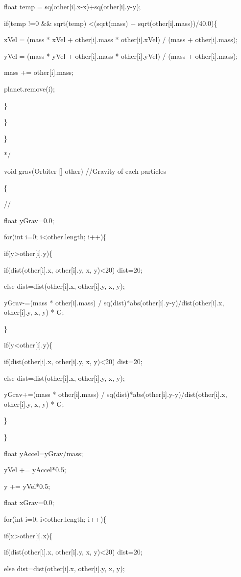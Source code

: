 \documentclass{gshs-hutech}
\begin{document}
\begin{tiny}
float temp = sq(other[i].x-x)+sq(other[i].y-y);

if(temp !=0 \&\& sqrt(temp) \textless (sqrt(mass) + sqrt(other[i].mass))/40.0)\{

xVel = (mass * xVel + other[i].mass * other[i].xVel) / (mass + other[i].mass);

yVel = (mass * yVel + other[i].mass * other[i].yVel) / (mass + other[i].mass);

mass += other[i].mass;

planet.remove(i);

\}

\}

\}

*/

void grav(Orbiter [] other)                                                                                          //Gravity of each particles

\{

//

float yGrav=0.0;

for(int i=0; i\textless other.length; i++)\{

if(y\textgreater other[i].y)\{

if(dist(other[i].x, other[i].y, x, y)\textless20) dist=20;

else dist=dist(other[i].x, other[i].y, x, y);

yGrav-=(mass * other[i].mass) / sq(dist)*abs(other[i].y-y)/dist(other[i].x, other[i].y, x, y) * G;

\}

if(y\textless other[i].y)\{

if(dist(other[i].x, other[i].y, x, y)\textless20) dist=20;

else dist=dist(other[i].x, other[i].y, x, y);

yGrav+=(mass * other[i].mass) / sq(dist)*abs(other[i].y-y)/dist(other[i].x, other[i].y, x, y) * G;

\}

\}

float yAccel=yGrav/mass;

yVel += yAccel*0.5;

y += yVel*0.5;


float xGrav=0.0;

for(int i=0; i\textless other.length; i++)\{

if(x\textgreater other[i].x)\{

if(dist(other[i].x, other[i].y, x, y)\textless20) dist=20;

else dist=dist(other[i].x, other[i].y, x, y);


\end{tiny}
\end{document}
